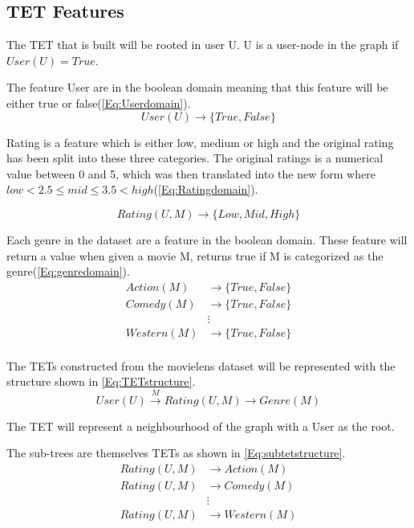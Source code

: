 \subsection{TET Features}
The TET that is built will be rooted in user U.
U is a user-node in the graph if $User(U) = True$. 

The feature User are in the boolean domain meaning that this feature will be either true or false(\autoref{Eq:Userdomain}).
\begin{equation}\label{Eq:Userdomain}
User(U)\rightarrow \{True, False\}
\end{equation}

Rating is a feature which is either low, medium or high and the original rating has been split into these three categories.
The original ratings is a numerical value between 0 and 5, which was then translated into the new form where $low<2.5\leq mid \leq 3.5<high$(\autoref{Eq:Ratingdomain}).

\begin{equation}\label{Eq:Ratingdomain}
Rating(U, M) \rightarrow \{Low, Mid, High\}
\end{equation}

Each genre in the dataset are a feature in the boolean domain. These feature will return a value when given a movie M, returns true if M is categorized as the genre(\autoref{Eq:genredomain}).
\begin{equation}\label{Eq:genredomain}
\begin{aligned}
Action(M)& \rightarrow \{True, False\} \\
Comedy(M)& \rightarrow \{True, False\} \\
&\vdots \\
Western(M)& \rightarrow \{True, False\} \\
\end{aligned}
\end{equation}

The TETs constructed from the movielens dataset will be represented with the structure shown in \autoref{Eq:TETstructure}.
\begin{equation}\label{Eq:TETstructure}
User(U) \stackrel{M}{\longrightarrow} Rating(U,M) \longrightarrow Genre(M)
\end{equation}

The TET will represent a neighbourhood of the graph with a User as the root.

The sub-trees are themselves TETs as shown in \autoref{Eq:subtetstructure}.
\begin{equation}\label{Eq:subtetstructure}
\begin{aligned}
Rating(U,M)& \longrightarrow Action(M) \\
Rating(U,M)& \longrightarrow Comedy(M)\\
& \vdots \\
Rating(U,M)& \longrightarrow Western(M)
\end{aligned}	
\end{equation}


